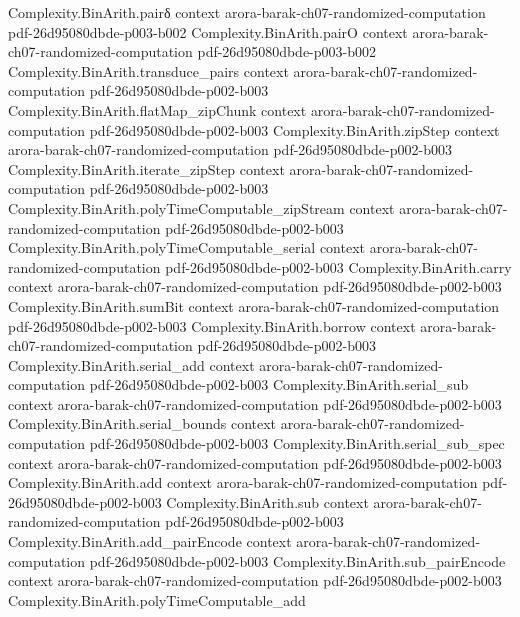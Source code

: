 \begin{theorem}
\proofstep
  {Complexity.BinArith.pairδ}
  {context}
  {arora-barak-ch07-randomized-computation}
  {pdf-26d95080dbde-p003-b002}
\proofstep
  {Complexity.BinArith.pairO}
  {context}
  {arora-barak-ch07-randomized-computation}
  {pdf-26d95080dbde-p003-b002}
\proofstep
  {Complexity.BinArith.transduce_pairs}
  {context}
  {arora-barak-ch07-randomized-computation}
  {pdf-26d95080dbde-p002-b003}
\proofstep
  {Complexity.BinArith.flatMap_zipChunk}
  {context}
  {arora-barak-ch07-randomized-computation}
  {pdf-26d95080dbde-p002-b003}
\proofstep
  {Complexity.BinArith.zipStep}
  {context}
  {arora-barak-ch07-randomized-computation}
  {pdf-26d95080dbde-p002-b003}
\proofstep
  {Complexity.BinArith.iterate_zipStep}
  {context}
  {arora-barak-ch07-randomized-computation}
  {pdf-26d95080dbde-p002-b003}
\proofstep
  {Complexity.BinArith.polyTimeComputable_zipStream}
  {context}
  {arora-barak-ch07-randomized-computation}
  {pdf-26d95080dbde-p002-b003}
\proofstep
  {Complexity.BinArith.polyTimeComputable_serial}
  {context}
  {arora-barak-ch07-randomized-computation}
  {pdf-26d95080dbde-p002-b003}
\proofstep
  {Complexity.BinArith.carry}
  {context}
  {arora-barak-ch07-randomized-computation}
  {pdf-26d95080dbde-p002-b003}
\proofstep
  {Complexity.BinArith.sumBit}
  {context}
  {arora-barak-ch07-randomized-computation}
  {pdf-26d95080dbde-p002-b003}
\proofstep
  {Complexity.BinArith.borrow}
  {context}
  {arora-barak-ch07-randomized-computation}
  {pdf-26d95080dbde-p002-b003}
\proofstep
  {Complexity.BinArith.serial_add}
  {context}
  {arora-barak-ch07-randomized-computation}
  {pdf-26d95080dbde-p002-b003}
\proofstep
  {Complexity.BinArith.serial_sub}
  {context}
  {arora-barak-ch07-randomized-computation}
  {pdf-26d95080dbde-p002-b003}
\proofstep
  {Complexity.BinArith.serial_bounds}
  {context}
  {arora-barak-ch07-randomized-computation}
  {pdf-26d95080dbde-p002-b003}
\proofstep
  {Complexity.BinArith.serial_sub_spec}
  {context}
  {arora-barak-ch07-randomized-computation}
  {pdf-26d95080dbde-p002-b003}
\proofstep
  {Complexity.BinArith.add}
  {context}
  {arora-barak-ch07-randomized-computation}
  {pdf-26d95080dbde-p002-b003}
\proofstep
  {Complexity.BinArith.sub}
  {context}
  {arora-barak-ch07-randomized-computation}
  {pdf-26d95080dbde-p002-b003}
\proofstep
  {Complexity.BinArith.add_pairEncode}
  {context}
  {arora-barak-ch07-randomized-computation}
  {pdf-26d95080dbde-p002-b003}
\proofstep
  {Complexity.BinArith.sub_pairEncode}
  {context}
  {arora-barak-ch07-randomized-computation}
  {pdf-26d95080dbde-p002-b003}
\proofstep
  {Complexity.BinArith.polyTimeComputable_add}

\end{theorem}
